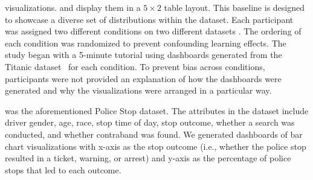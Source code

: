 visualizations. 
and display them in a $5\times2$ table layout. 
This baseline is designed to showcase a diverse set of 
distributions within the dataset.
\smallskip
{} 
Each participant was assigned two different 
conditions on two different datasets 
. 
The ordering of each condition was 
randomized to prevent confounding learning effects. 
The study began with a 5-minute tutorial 
using dashboards generated from the Titanic dataset~\cite{titanic} 
for each condition. 
To prevent bias across conditions, 
participants were not provided an explanation of 
how the dashboards were generated and 
why the visualizations were arranged in a particular way. 

 was the aforementioned 
Police Stop dataset. 
The attributes in the dataset 
include driver gender, age, race, stop time of day, 
stop outcome, whether a search was conducted, 
and whether contraband was found. 
We generated dashboards of bar chart visualizations 
with x-axis as the stop outcome 
(i.e., whether the police stop resulted in a 
ticket, warning, or arrest) and y-axis as the percentage of police stops that led to each outcome. %

